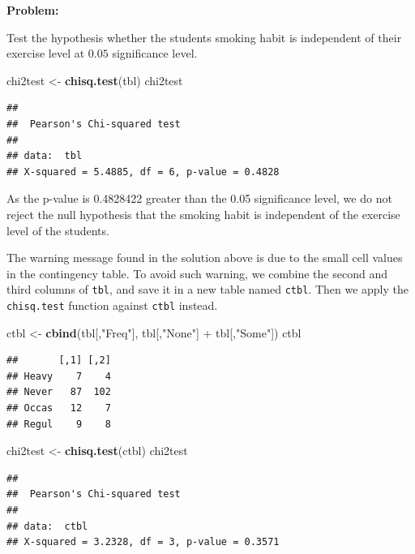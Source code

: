 \documentclass[]{article}
\newenvironment{Shaded}{\begin{snugshade}}{\end{snugshade}}
\newcommand{\KeywordTok}[1]{\textcolor[rgb]{0.13,0.29,0.53}{\textbf{{#1}}}}
\newcommand{\StringTok}[1]{\textcolor[rgb]{0.31,0.60,0.02}{{#1}}}
\newcommand{\NormalTok}[1]{{#1}}
\numberwithin{equation}{section}
\begin{document}
\textbf{Problem:}

Test the hypothesis whether the students smoking habit is independent of
their exercise level at \(0.05\) significance level.

\begin{Shaded}
\begin{Highlighting}[]
\NormalTok{chi2test <-}\StringTok{ }\KeywordTok{chisq.test}\NormalTok{(tbl) }
\NormalTok{chi2test}
\end{Highlighting}
\end{Shaded}

\begin{verbatim}
## 
##  Pearson's Chi-squared test
## 
## data:  tbl
## X-squared = 5.4885, df = 6, p-value = 0.4828
\end{verbatim}

As the p-value is 0.4828422 greater than the 0.05 significance level, we
do not reject the null hypothesis that the smoking habit is independent
of the exercise level of the students.

The warning message found in the solution above is due to the small cell
values in the contingency table. To avoid such warning, we combine the
second and third columns of \texttt{tbl}, and save it in a new table
named \texttt{ctbl}. Then we apply the \texttt{chisq.test} function
against \texttt{ctbl} instead.

\begin{Shaded}
\begin{Highlighting}[]
\NormalTok{ctbl <-}\StringTok{ }\KeywordTok{cbind}\NormalTok{(tbl[,}\StringTok{"Freq"}\NormalTok{], tbl[,}\StringTok{"None"}\NormalTok{] +}\StringTok{ }\NormalTok{tbl[,}\StringTok{"Some"}\NormalTok{])}
\NormalTok{ctbl}
\end{Highlighting}
\end{Shaded}

\begin{verbatim}
##       [,1] [,2]
## Heavy    7    4
## Never   87  102
## Occas   12    7
## Regul    9    8
\end{verbatim}

\begin{Shaded}
\begin{Highlighting}[]
\NormalTok{chi2test <-}\StringTok{ }\KeywordTok{chisq.test}\NormalTok{(ctbl)}
\NormalTok{chi2test}
\end{Highlighting}
\end{Shaded}

\begin{verbatim}
## 
##  Pearson's Chi-squared test
## 
## data:  ctbl
## X-squared = 3.2328, df = 3, p-value = 0.3571
\end{verbatim}
\end{document}
